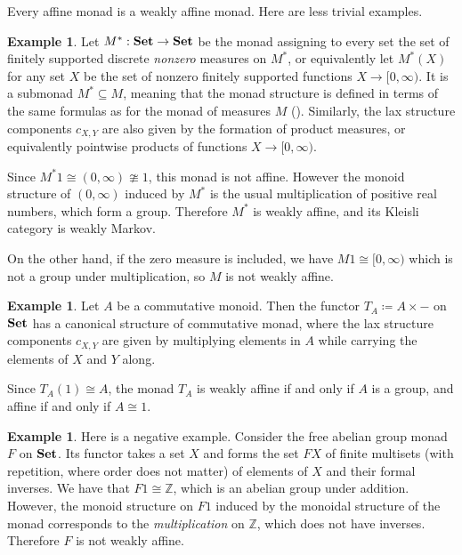 \documentclass[a4paper,UKenglish,numberwithinsect,cleveref, autoref, thm-restate]{lipics-v2021}
\theoremstyle{plain} %
\theoremstyle{definition} %
\newtheorem{myexample}[mytheorem]{Example}
\begin{document}
Every affine monad is a weakly affine monad. Here are less trivial examples.

\begin{myexample}
    \label{ex:nonzero_measures}
	Let $M^* : \mathbf{Set} \to \mathbf{Set}$ be the monad assigning to every set the set of finitely supported discrete \emph{nonzero}
	measures on $M^*$, or equivalently let $M^*(X)$ for any set $X$ be the set of nonzero finitely supported functions $X \to [0,\infty)$.
	It is a submonad $M^* \subseteq M$, meaning that the monad structure is defined in terms of the same formulas as for the monad of measures $M$ ().
	Similarly, the lax structure components $c_{X,Y}$ are also given by the formation of product measures, or equivalently pointwise products of functions 
	$X \to [0,\infty)$.

	Since $M^* 1 \cong (0,\infty)\ncong 1$, this monad is not affine. However the monoid structure of $(0,\infty)$ induced by $M^*$ is the usual multiplication of positive real numbers, which form a group. Therefore $M^*$ is weakly affine, and its Kleisli category is weakly Markov.


	On the other hand, if the zero measure is included, we have $M1 \cong [0,\infty)$ which is not a group under multiplication, so $M$ is not weakly affine.
\end{myexample}

\begin{myexample}
	\label{ex:abelian_group}
	Let $A$ be a commutative monoid.
	Then the functor $T_A \coloneqq A \times -$ on $\mathbf{Set}$ has a canonical structure of commutative monad, 
	where the lax structure components $c_{X,Y}$ are given by multiplying elements in $A$ while carrying the elements 
	of $X$ and $Y$ along.

	Since $T_A(1) \cong A$, the monad $T_A$ is weakly affine if and only if $A$ is a group, and affine if and only if $A\cong 1$.
\end{myexample}

\begin{myexample}
    \label{ex:nonexample}
    Here is a negative example.
    Consider the free abelian group monad $F$ on $\mathbf{Set}$. Its functor takes a set $X$ and forms the set $FX$ of finite multisets (with repetition, where order does not matter) of elements of $X$ and their formal inverses. 
    We have that $F1\cong \mathbb{Z}$, which is an abelian group under addition. 
    However, the monoid structure on $F1$ induced by the monoidal structure of the monad corresponds to the \emph{multiplication} on $\mathbb{Z}$, which does not have inverses. Therefore $F$ is not weakly affine. 
\end{myexample}
\end{document}
